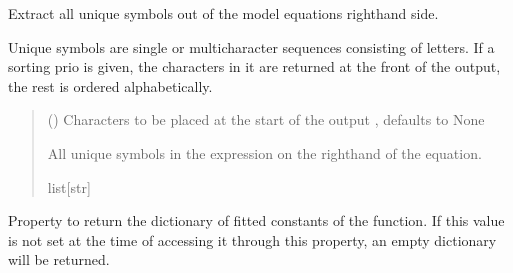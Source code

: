 \documentclass[letterpaper,10pt,english]{sphinxmanual}
\begin{document}
\begin{fulllineitems}
\begin{fulllineitems}
\label{\detokenize{VPCModel:src.VPCModel.VPCModel.extract_symbols}}
\pysigstartsignatures
{}
\pysigstopsignatures
\sphinxAtStartPar
Extract all unique symbols out of the model equations right\sphinxhyphen{}hand side.

\sphinxAtStartPar
Unique symbols are single or multi\sphinxhyphen{}character sequences consisting of letters.
If a sorting prio is given, the characters in it are returned at the front of the output,
the rest is ordered alphabetically.
\begin{quote}\begin{description}
\sphinxAtStartPar
{} (\sphinxstyleliteralemphasis{\sphinxupquote{{[}}}\sphinxstyleliteralemphasis{\sphinxupquote{{]} }}\sphinxstyleliteralemphasis{\sphinxupquote{| }}\sphinxstyleliteralemphasis{\sphinxupquote{, }}) \textendash{} Characters to be placed at the start of the output , defaults to None

\sphinxAtStartPar
All unique symbols in the expression on the right\sphinxhyphen{}hand of the equation.

\sphinxAtStartPar
list{[}str{]}

\end{description}\end{quote}

\end{fulllineitems}


\begin{fulllineitems}
\label{\detokenize{VPCModel:src.VPCModel.VPCModel.fitted_consts}}
\pysigstartsignatures
{}
\pysigstopsignatures
\sphinxAtStartPar
Property to return the dictionary of fitted constants of the function.
If this value is not set at the time of accessing it through this property,
an empty dictionary will be returned.


\end{fulllineitems}
\end{fulllineitems}
\end{document}
